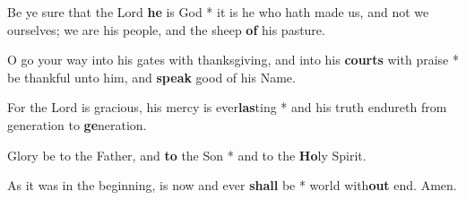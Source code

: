 \begin{multicols}{2}
	Be ye sure that the Lord \textbf{he} is God * it is he who hath made us, and not we ourselves; we are his people, and the sheep \textbf{of} his pasture.
	
	O go your way into his gates with thanksgiving, and into his \textbf{courts} with praise * be thankful unto him, and \textbf{speak} good of his Name.
	
	For the Lord is gracious, his mercy is ever\textbf{las}ting * and his truth endureth from generation to \textbf{ge}neration.
	
	Glory be to the Father, and \textbf{to} the Son * and to the \textbf{Ho}ly Spirit.
	
	As it was in the beginning, is now and ever \textbf{shall} be * world with\textbf{out} end. Amen.
\end{multicols}